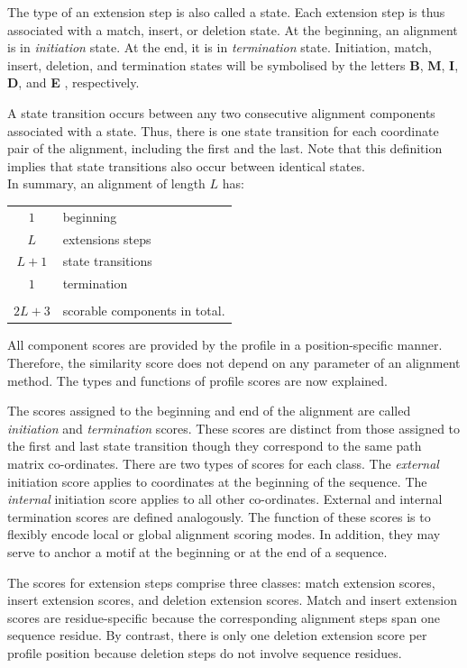 \documentclass[a4paper,10pt,twoside]{scrartcl}
\begin{document}
  The type of an extension step is also called a state. Each extension step is thus associated with a match, insert, or deletion state. At the beginning, 
  an alignment is in \emph{initiation} state. At the end, it is in \emph{termination} state.  Initiation, match, insert, deletion, and termination
  states will be symbolised by the letters \textbf{B}, \textbf{M}, \textbf{I}, \textbf{D}, and \textbf{E} , respectively.

  A state transition occurs between any two consecutive alignment components associated with a state. Thus, there is one state transition for each coordinate
  pair of the alignment, including the first and the last. Note that this definition implies that state transitions also occur between identical states.\\
  In summary, an alignment of length $L$ has:\\
  \begin{center}
  \begin{tabular}{cl}
   $1$ & beginning \\
   $L$ & extensions steps \\
  $L+1$ & state transitions \\
   $1$ & termination \\
   \hline \\
  $2L+3$ & scorable components in total.
  \end{tabular}
  \end{center}
  
  All component scores are provided by the profile in a position-specific manner.  Therefore, the similarity score does not depend on any parameter
  of an alignment method. The types and functions of profile scores are now explained.

  The scores assigned to the beginning and end of the alignment are called \emph{initiation} and \emph{termination} scores. These scores are distinct from
  those assigned to the first and last state transition though they correspond to the same path matrix co-ordinates. There are two types of
  scores for each class. The \emph{external} initiation score applies to coordinates at the beginning of the sequence. The \emph{internal} initiation
  score applies to all other co-ordinates. External and internal termination scores are defined analogously. The function of these scores is to
  flexibly encode local or global alignment scoring modes.  In addition, they may serve to anchor a motif at the beginning or at the end of a sequence.

  The scores for extension steps comprise three classes: match extension scores, insert extension scores, and deletion extension scores. Match and
  insert extension scores are residue-specific because the corresponding alignment steps span one sequence residue. By contrast, there is only one
  deletion extension score per profile position because deletion steps do not involve sequence residues.
\end{document}
